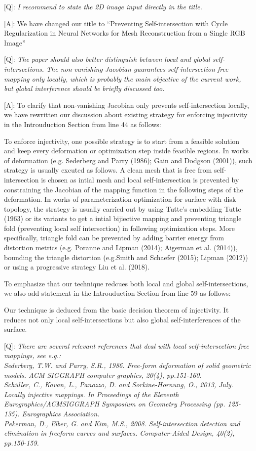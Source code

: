 \documentclass[10pt]{letter} %
\newcommand{\mdf}[1]{\textcolor[rgb]{1.00,0.00,1.00}{#1}}
\begin{document}
	[Q]: \emph{I recommend to state the 2D image input directly in the title.}
	
	[A]: We have changed our title to ``Preventing Self-intersection with Cycle Regularization \mdf{in Neural Networks for Mesh Reconstruction from a Single RGB Image}''
	
	[Q]: \emph{The paper should also better distinguish between local and global self-intersections. The non-vanishing Jacobian guarantees self-intersection free mapping only locally, which is probably the main objective of the current work, but global interference should be briefly discussed too.}
	
	[A]: To clarify that non-vanishing Jacobian only prevents self-intersection locally, we have rewritten our discussion about existing strategy for enforcing injectivity in the Introuduction Section from line 44 as follows:
	
	\mdf{To enforce injectivity, one possible strategy is to start from a feasible solution and keep every deformation or optimization step inside feasible regions. In works of deformation (e.g. Sederberg and Parry (1986); Gain and Dodgson (2001)), such strategy is usually excuted as follows. A clean mesh that is free from self-intersection is chosen as intial mesh and local self-intersection is prevented by constraining the Jacobian of the mapping function in the following steps of the deformation. In works of parameterization optimization for surface with disk topology, the strategy is usually carried out by using Tutte’s embedding Tutte (1963) or its variants to get a intial bijiective mapping and preventing triangle fold (preventing local self intersection) in following optimization steps. More specifically, triangle fold can be prevented by adding barrier energy from distortion metrics (e.g. Poranne and Lipman (2014); Aigerman et al. (2014)), bounding the triangle distortion (e.g.Smith and Schaefer (2015); Lipman (2012)) or using a progressive strategy Liu et al. (2018). }
	
	To emphasize that our technique redcues both local and global self-intersections, we also add statement in the Introuduction Section from line 59 as follows:
	
	\mdf{Our technique is deduced from the basic decision theorem of injectivity. It reduces not only local self-intersections but also global self-interferences of the surface.}
	
	[Q]: 
	\emph{There are several relevant references that deal with local self-intersection free mappings, see e.g.:\\
	Sederberg, T.W. and Parry, S.R., 1986. Free-form deformation of solid geometric models. ACM SIGGRAPH computer graphics, 20(4), pp.151-160.\\
	Schüller, C., Kavan, L., Panozzo, D. and Sorkine-Hornung, O., 2013, July. Locally injective mappings. In Proceedings of the Eleventh Eurographics/ACMSIGGRAPH Symposium on Geometry Processing (pp. 125-135). Eurographics Association.\\
	Pekerman, D., Elber, G. and Kim, M.S., 2008. Self-intersection detection and elimination in freeform curves and surfaces. Computer-Aided Design, 40(2), pp.150-159.}
\end{document}
